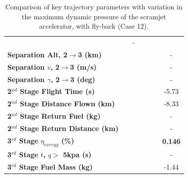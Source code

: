 \begin{table}[ht]
\begin{tabular}{l c c c c c c}
			& \textbf{\secondExergyEffqSixty}
			& -
			\\
			\textbf{Separation Alt, 2$\rightarrow$3 (km)}
			& \secondthirdSeparationAltqForty
			& \secondthirdSeparationAltqFortyFive
			& \secondthirdSeparationAltqStandard
			& \secondthirdSeparationAltqFiftyFive
			& \secondthirdSeparationAltqSixty
			& -
			\\
			\textbf{Separation $v$, 2$\rightarrow$3 (m/s)}
			& \secondthirdSeparationvqForty
			& \secondthirdSeparationvqFortyFive
			& \secondthirdSeparationvqStandard
			& \secondthirdSeparationvqFiftyFive
			& \secondthirdSeparationvqSixty
			& -
			\\
			\textbf{Separation $\gamma$, 2$\rightarrow$3 (deg)}
			& \secondthirdSeparationgammaqForty
			& \secondthirdSeparationgammaqFortyFive
			& \secondthirdSeparationgammaqStandard
			& \secondthirdSeparationgammaqFiftyFive
			& \secondthirdSeparationgammaqSixty
			& -
			\\
			\textbf{2$^{nd}$ Stage Flight Time (s)}
			& \secondFlightTimeqForty
			& \secondFlightTimeqFortyFive
			& \secondFlightTimeqStandard
			& \secondFlightTimeqFiftyFive
			& \secondFlightTimeqSixty
			&-5.73
			\\
			\textbf{2$^{nd}$ Stage Distance Flown (km)}
			& \SecondDistqForty
			& \SecondDistqFortyFive
			& \SecondDistqStandard
			& \SecondDistqFiftyFive
			& \SecondDistqSixty
			&-8.33
			\\
			\textbf{2$^{nd}$ Stage Return Fuel (kg)}
			& \returnFuelqForty
			& \returnFuelqFortyFive
			& \returnFuelqStandard
			& \returnFuelqFiftyFive
			& \returnFuelqSixty
			& -
			\\
			\textbf{2$^{nd}$ Stage Return Distance (km)}
			& \returnDistqForty
			& \returnDistqFortyFive
			& \returnDistqStandard
			& \returnDistqFiftyFive
			& \returnDistqSixty
			& -
			\\
			\hline 
			\textbf{3$^{rd}$ Stage $\eta_{exergy}$ (\%)}
			& \textbf{\thirddExergyEffqForty}
			& \textbf{\thirddExergyEffqFortyFive}
			& \textbf{\thirddExergyEffqStandard}
			& \textbf{\thirddExergyEffqFiftyFive}
			& \textbf{\thirddExergyEffqSixty}
			& \textbf{0.146}
			\\
			\textbf{3$^{rd}$ Stage $t$, $q >$ 5kpa (s)}
			& \thirdqOverFiveqForty
			& \thirdqOverFiveqFortyFive
			& \thirdqOverFiveqStandard
			& \thirdqOverFiveqFiftyFive
			& \thirdqOverFiveqSixty
			& -
			\\
			\textbf{3$^{rd}$ Stage Fuel Mass (kg)}
			& \thirdmFuelqForty
			& \thirdmFuelqFortyFive
			& \thirdmFuelqStandard
			& \thirdmFuelqFiftyFive
			& \thirdmFuelqSixty
			&-1.44
			\\
			\hline 
		\end{tabular} 
	\caption{Comparison of key trajectory parameters with variation in the maximum dynamic pressure of the scramjet accelerator, with fly-back (Case 12).}
	\label{tab:qvarreturn}
\end{table}


